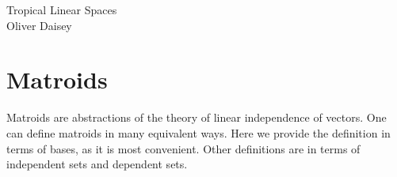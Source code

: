 \documentclass[12pt]{article}
\theoremstyle{definition}
\begin{document}

\begin{center}
    \Large Tropical Linear Spaces \\
    \vspace{5mm}
    \small Oliver Daisey
\end{center}

\section{Matroids}	
Matroids are abstractions of the theory of linear independence of vectors. One can define matroids in many equivalent ways. Here we provide the definition in terms of bases, as it is most convenient. Other definitions are in terms of independent sets and dependent sets.
\end{document}
